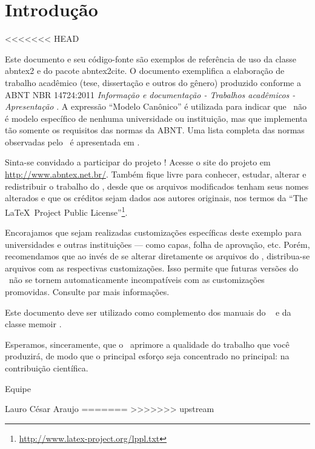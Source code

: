 \chapter{Introdução}
<<<<<<< HEAD

Este documento e seu código-fonte são exemplos de referência de uso da classe
\textsf{abntex2} e do pacote \textsf{abntex2cite}. O documento
exemplifica a elaboração de trabalho acadêmico (tese, dissertação e outros do
gênero) produzido conforme a ABNT NBR 14724:2011 \emph{Informação e documentação
- Trabalhos acadêmicos - Apresentação} \cite{NBR14724:2011}.
A expressão ``Modelo Canônico'' é utilizada para indicar que \abnTeX\ não é
modelo específico de nenhuma universidade ou instituição, mas que implementa tão
somente os requisitos das normas da ABNT. Uma lista completa das normas
observadas pelo \abnTeX\ é apresentada em \cite{abntex2classe}.

Sinta-se convidado a participar do projeto \abnTeX! Acesse o site do projeto em
\url{http://www.abntex.net.br/}. Também fique livre para conhecer,
estudar, alterar e redistribuir o trabalho do \abnTeX, desde que os arquivos
modificados tenham seus nomes alterados e que os créditos sejam dados aos
autores originais, nos termos da ``The \LaTeX\ Project Public
License''\footnote{\url{http://www.latex-project.org/lppl.txt}}.

Encorajamos que sejam realizadas customizações específicas deste exemplo para
universidades e outras instituições --- como capas, folha de aprovação, etc.
Porém, recomendamos que ao invés de se alterar diretamente os arquivos do
\abnTeX, distribua-se arquivos com as respectivas customizações.
Isso permite que futuras versões do \abnTeX~não se tornem automaticamente
incompatíveis com as customizações promovidas. Consulte
\cite{abntex2-wiki-como-customizar} par mais informações.

Este documento deve ser utilizado como complemento dos manuais do \abnTeX\
\cite{abntex2classe,abntex2cite,abntex2cite-alf} e da classe \textsf{memoir}
\cite{memoir}.

Esperamos, sinceramente, que o \abnTeX\ aprimore a qualidade do trabalho que
você produzirá, de modo que o principal esforço seja concentrado no principal:
na contribuição científica.

Equipe \abnTeX

Lauro César Araujo
=======
>>>>>>> upstream
